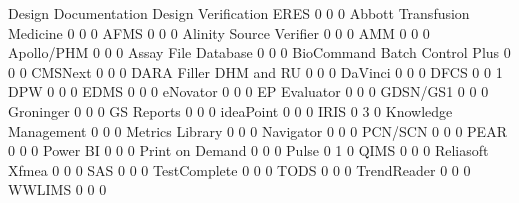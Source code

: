 \documentclass{article}
\begin{document}
\begin{Schunk}
\begin{Soutput}
                                Design Documentation Design Verification ERES
                                                   0                   0    0
  Abbott Transfusion Medicine                      0                   0    0
  AFMS                                             0                   0    0
  Alinity Source Verifier                          0                   0    0
  AMM                                              0                   0    0
  Apollo/PHM                                       0                   0    0
  Assay File Database                              0                   0    0
  BioCommand Batch Control Plus                    0                   0    0
  CMSNext                                          0                   0    0
  DARA Filler DHM and RU                           0                   0    0
  DaVinci                                          0                   0    0
  DFCS                                             0                   0    1
  DPW                                              0                   0    0
  EDMS                                             0                   0    0
  eNovator                                         0                   0    0
  EP Evaluator                                     0                   0    0
  GDSN/GS1                                         0                   0    0
  Groninger                                        0                   0    0
  GS Reports                                       0                   0    0
  ideaPoint                                        0                   0    0
  IRIS                                             0                   3    0
  Knowledge Management                             0                   0    0
  Metrics Library                                  0                   0    0
  Navigator                                        0                   0    0
  PCN/SCN                                          0                   0    0
  PEAR                                             0                   0    0
  Power BI                                         0                   0    0
  Print on Demand                                  0                   0    0
  Pulse                                            0                   1    0
  QIMS                                             0                   0    0
  Reliasoft Xfmea                                  0                   0    0
  SAS                                              0                   0    0
  TestComplete                                     0                   0    0
  TODS                                             0                   0    0
  TrendReader                                      0                   0    0
  WWLIMS                                           0                   0    0
                               

\end{Soutput}
\end{Schunk}
\end{document}
